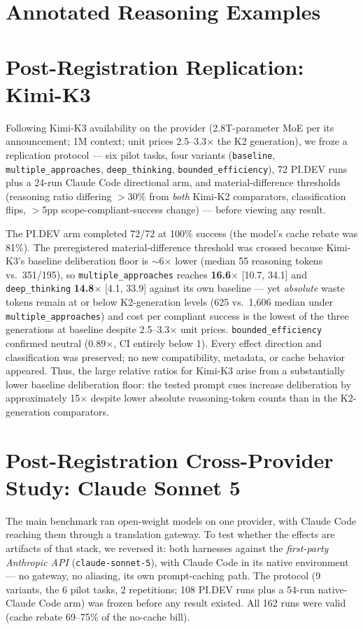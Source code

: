 \documentclass[11pt]{article}
\newcommand{\pidev}{PI.DEV}
\newcommand{\cc}{Claude Code}
\newcommand{\xd}{$\times$}
\begin{document}
\section{Annotated Reasoning Examples}
\label{app:examples}


\section{Post-Registration Replication: Kimi-K3}

Following Kimi-K3 availability on the provider (2.8T-parameter MoE
per its announcement; 1M context; unit prices 2.5--3.3\xd{} the K2 generation), we froze a
replication protocol --- six pilot tasks, four variants
(\texttt{baseline}, \texttt{multiple\_approaches},
\texttt{deep\_thinking}, \texttt{bounded\_efficiency}), 72 \pidev{} runs
plus a 24-run \cc{} directional arm, and material-difference thresholds
(reasoning ratio differing $>$30\% from \emph{both} Kimi-K2 comparators,
classification flips, $>$5pp scope-compliant-success change) --- before
viewing any result.

The \pidev{} arm completed 72/72 at 100\% success (the
model's cache rebate was 81\%). The preregistered material-difference threshold was crossed because Kimi-K3's baseline deliberation floor is
$\sim$6\xd{} lower (median 55 reasoning tokens vs.\ 351/195), so
\texttt{multiple\_approaches} reaches \textbf{16.6\xd} [10.7, 34.1] and
\texttt{deep\_thinking} \textbf{14.8\xd} [4.1, 33.9] against its own
baseline --- yet \emph{absolute} waste tokens remain at or below
K2-generation levels (625 vs.\ 1{,}606 median under
\texttt{multiple\_approaches}) and cost per compliant success is the
lowest of the three generations at baseline despite
2.5--3.3\xd{} unit prices. \texttt{bounded\_efficiency} confirmed neutral
(0.89\xd, CI entirely below 1). Every effect direction and classification
was preserved; no new compatibility, metadata, or cache behavior appeared.
Thus, the large relative ratios for Kimi-K3 arise from a substantially lower
baseline deliberation floor: the tested prompt cues increase deliberation by
approximately 15\xd{} despite lower absolute reasoning-token counts than in
the K2-generation comparators.

\section{Post-Registration Cross-Provider Study: Claude Sonnet 5}

The main benchmark ran open-weight models on one provider, with \cc{}
reaching them through a translation gateway. To test whether the effects
are artifacts of that stack, we reversed it: both harnesses against the
\emph{first-party Anthropic API} (\texttt{claude-sonnet-5}), with \cc{} in
its native environment --- no gateway, no aliasing, its own prompt-caching
path. The protocol (9 variants, the 6 pilot tasks, 2 repetitions; 108
\pidev{} runs plus a 54-run native-\cc{} arm) was frozen before any result
existed. All 162 runs were valid (cache rebate 69--75\% of the no-cache bill).
\end{document}
